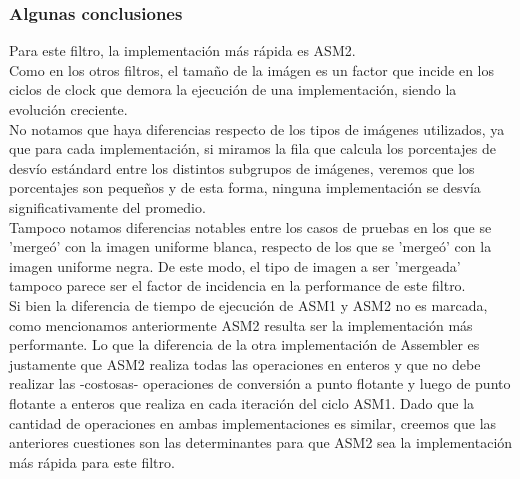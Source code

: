 \subsubsection{Algunas conclusiones}
Para este filtro, la implementación más rápida es ASM2.\\
Como en los otros filtros, el tamaño de la imágen es un factor que incide en los ciclos de clock que demora la ejecución de una implementación, siendo la evolución creciente.\\
No notamos que haya diferencias respecto de los tipos de imágenes utilizados, ya que para cada implementación, si miramos la fila que calcula los porcentajes de desvío estándard entre los distintos subgrupos de imágenes, veremos que los porcentajes son pequeños y de esta forma, ninguna implementación se desvía significativamente del promedio.\\
Tampoco notamos diferencias notables entre los casos de pruebas en los que se 'mergeó' con la imagen uniforme blanca, respecto de los que se 'mergeó' con la imagen uniforme negra. De este modo, el tipo de imagen a ser 'mergeada' tampoco parece ser el factor de incidencia en la performance de este filtro.\\
Si bien la diferencia de tiempo de ejecución de ASM1 y ASM2 no es marcada, como mencionamos anteriormente ASM2 resulta ser la implementación más performante. Lo que la diferencia de la otra implementación de Assembler es justamente que ASM2 realiza todas las operaciones en enteros y que no debe realizar las -costosas- operaciones de conversión a punto flotante y luego de punto flotante a enteros que realiza en cada iteración del ciclo ASM1. Dado que la cantidad de operaciones en ambas implementaciones es similar, creemos que las anteriores cuestiones son las determinantes para que ASM2 sea la implementación más rápida para este filtro.\\


